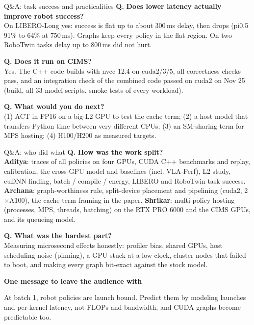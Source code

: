 \documentclass[aspectratio=169,10pt]{beamer}
\newcommand{\qa}[2]{\textbf{\textcolor{accent}{Q.}} \textbf{#1}\\[0.2em]{\small #2}\par\medskip}
\begin{document}
\begin{frame}{Q\&A: task success and practicalities}
\qa{Does lower latency actually improve robot success?}{On LIBERO-Long yes: success is flat up
to about 300\,ms delay, then drops (pi0.5 91\% to 64\% at 750\,ms). Graphs keep every policy in
the flat region. On two RoboTwin tasks delay up to 800\,ms did not hurt.}
\qa{Does it run on CIMS?}{Yes. The C++ code builds with nvcc 12.4 on cuda2/3/5, all
correctness checks pass, and an integration check of the combined code passed on cuda2 on Nov
25 (build, all 33 model scripts, smoke tests of every workload).}
\qa{What would you do next?}{(1) ACT in FP16 on a big-L2 GPU to test the cache term; (2) a
host model that transfers Python time between very different CPUs; (3) an SM-sharing term for
MPS hosting; (4) H100/H200 as measured targets.}
\end{frame}

\begin{frame}{Q\&A: who did what}
\qa{How was the work split?}{\textbf{Aditya}: traces of all policies on four GPUs, CUDA C++
benchmarks and replay, calibration, the cross-GPU model and baselines (incl. VLA-Perf), L2
study, cuDNN finding, batch / compile / energy, LIBERO and RoboTwin task success.
\textbf{Archana}: graph-worthiness rule, split-device placement and pipelining (cuda2, 2$\times$A100),
the cache-term framing in the paper. \textbf{Shrikar}: multi-policy hosting (processes, MPS,
threads, batching) on the RTX PRO 6000 and the CIMS GPUs, and its queueing model.}
\qa{What was the hardest part?}{Measuring microsecond effects honestly: profiler bias, shared
GPUs, host scheduling noise (pinning), a GPU stuck at a low clock, cluster nodes that failed to
boot, and making every graph bit-exact against the stock model.}
\end{frame}

\begin{frame}[plain]
\centering\vfill
{\Large\bfseries\textcolor{accent}{One message to leave the audience with}}\\[1.2em]
\begin{minipage}{0.8\textwidth}\centering\large
At batch 1, robot policies are \alert{launch bound}. Predict them by modeling launches and
per-kernel latency, not FLOPs and bandwidth, and CUDA graphs become predictable too.
\end{minipage}
\vfill
\end{frame}
\end{document}
